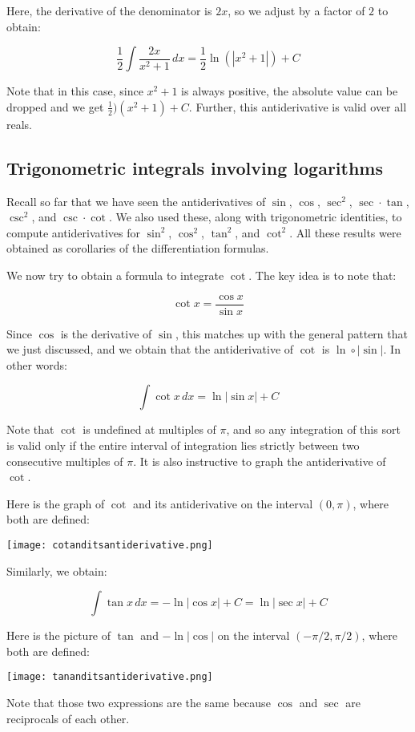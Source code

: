 \documentclass[10pt]{amsart}
\begin{document}
Here, the derivative of the denominator is $2x$, so we adjust by a
factor of $2$ to obtain:

$$\frac{1}{2} \int \frac{2x}{x^2 + 1} \, dx = \frac{1}{2} \ln(|x^2 + 1|) + C$$

Note that in this case, since $x^2 + 1$ is always positive, the
absolute value can be dropped and we get $\frac{1}{2})(x^2 + 1) +
C$. Further, this antiderivative is valid over all reals.

\subsection{Trigonometric integrals involving logarithms}

Recall so far that we have seen the antiderivatives of $\sin$, $\cos$,
$\sec^2$, $\sec \cdot \tan$, $\csc^2$, and $\csc \cdot \cot$. We also
used these, along with trigonometric identities, to compute
antiderivatives for $\sin^2$, $\cos^2$, $\tan^2$, and $\cot^2$. All
these results were obtained as corollaries of the differentiation
formulas.

We now try to obtain a formula to integrate $\cot$. The key idea is to
note that:

$$\cot x = \frac{\cos x}{\sin x}$$

Since $\cos$ is the derivative of $\sin$, this matches up with the
general pattern that we just discussed, and we obtain that the
antiderivative of $\cot$ is $\ln \circ |\sin|$. In other words:

$$\int \cot x \, dx = \ln|\sin x| + C$$

Note that $\cot$ is undefined at multiples of $\pi$, and so any
integration of this sort is valid only if the entire interval of
integration lies strictly between two consecutive multiples of
$\pi$. It is also instructive to graph the antiderivative of $\cot$.

Here is the graph of $\cot$ and its antiderivative on the interval
$(0,\pi)$, where both are defined:

\texttt{[image: cotanditsantiderivative.png]}

Similarly, we obtain:

$$\int \tan x \, dx = - \ln|\cos x| + C = \ln|\sec x| + C$$

Here is the picture of $\tan$ and $-\ln|\cos|$ on the interval
$(-\pi/2,\pi/2)$, where both are defined:

\texttt{[image: tananditsantiderivative.png]}

Note that those two expressions are the same because
$\cos$ and $\sec$ are reciprocals of each other.
\end{document}
